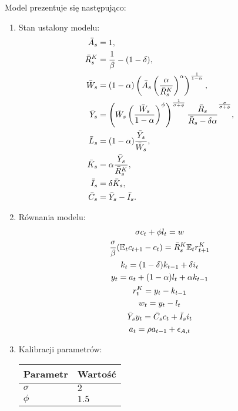 Model prezentuje się następująco:
\begin{enumerate}
    \item Stan ustalony modelu:
        \begin{align}
                \bar{A}_s &= 1, \\
                \bar{R}_s^K &= \frac{1}{\beta} - (1 - \delta), \\
                \bar{W}_s &= (1-\alpha)\left(\bar{A}_s \left(\frac{\alpha}{\bar{R}_s^{K}}\right)^\alpha\right)^{\frac{1}{1-\alpha}}, \\
                \bar{Y}_s &= \left( \bar{W}_s \left( \frac{\bar{W}_s}{1-\alpha}\right)^\phi\right)^{\frac{1}{\sigma + \phi}} \frac{\bar{R}_s}{\bar{R}_s - \delta \alpha}^{\frac{\sigma}{\sigma + \phi}}, \\
                \bar{L}_s &= (1-\alpha)\frac{\bar{Y}_s}{\bar{W}_s}, \\
                \bar{K}_s &= \alpha\frac{\bar{Y}_s}{\bar{R}_s^K},\\
                \bar{I}_s &= \delta \bar{K}_s, \\
                \bar{C}_s &= \bar{Y}_s - \bar{I}_s.
        \end{align}
    \item Równania modelu:
    \begin{gather}
        \sigma c_{t} + \phi l_t = w \\
        \frac{\sigma}{\beta} (\mathbb{E}_t c_{t+1} - c_t) = \bar{R}_s^K \mathbb{E}_t r^K_{t+1} \\
        k_t = (1 - \delta) k_{t-1} + \delta i_t \\ 
        y_t = a_t + (1-\alpha) l_t + \alpha k_{t-1} \\
        r^K_t = y_t - k_{t-1}   \\
        w_t = y_t - l_t \\
        \bar{Y}_s y_t = \bar{C}_s c_t + \bar{I}_s i_t \\
        a_t = \rho a_{t-1} + \epsilon_{A,t}
    \end{gather}
    \item Kalibracji parametrów:
        \begin{center}
            \begin{tabular}{|p{}|p{}|}
                \hline
                Parametr & Wartość \\
                \hline 
                $\sigma$ & $2$\\
                $\phi$ & $1.5$ \\

\end{tabular}
\end{center}
\end{enumerate}
